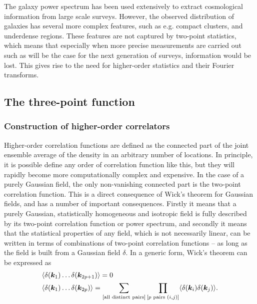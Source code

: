 The galaxy power spectrum has been used extensively to extract cosmological information from large scale surveys. However, the observed distribution of galaxies has several more complex features, such as e.g. compact clusters, and underdense regions. These features are not captured by two-point statistics, which means that especially when more precise measurements are carried out such as will be the case for the next generation of surveys, information would be lost. This gives rise to the need for higher-order statistics and their Fourier transforms. 

\subsection{The three-point function}

\subsubsection{Construction of higher-order correlators}

Higher-order correlation functions are defined as the connected part of the joint ensemble average of the density in an arbitrary number of locations. In principle, it is possible define any order of correlation function like this, but they will rapidly become more computationally complex and expensive. In the case of a purely Gaussian field, the only non-vanishing connected part is the two-point correlation function. This is a direct consequence of Wick's theorem for Gaussian fields, and has a number of important consequences. Firstly it means that a purely Gaussian, statistically homogeneous and isotropic field is fully described by its two-point correlation function or power spectrum, and secondly it means that the statistical properties of any field, which is not necessarily linear, can be written in terms of combinations of two-point correlation functions -- as long as the field is built from a Gaussian field $\delta$. In a generic form, Wick's theorem can be expressed as 
\begin{align}
	&\langle \delta(\bm {k}_1) \ldots \delta(\bm{k}_{2p + 1}) \rangle = 0 \nonumber \\
	&\langle \delta(\bm {k}_1) \ldots \delta(\bm{k}_{2p})\rangle = \sum_{[\text{all distinct pairs}]} \prod_{[p \text{ pairs } (i,j)]} \langle \delta(\bm{k}_i) \delta(\bm{k}_j) \rangle.  
\end{align}

